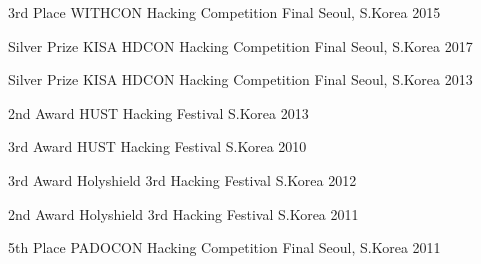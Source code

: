 \begin{cvhonors}

  \cvhonor
    {3rd Place} %
    {WITHCON Hacking Competition Final} %
    {Seoul, S.Korea} %
    {2015} %

  \cvhonor
    {Silver Prize} %
    {KISA HDCON Hacking Competition Final} %
    {Seoul, S.Korea} %
    {2017} %

  \cvhonor
    {Silver Prize} %
    {KISA HDCON Hacking Competition Final} %
    {Seoul, S.Korea} %
    {2013} %

  \cvhonor
    {2nd Award} %
    {HUST Hacking Festival} %
    {S.Korea} %
    {2013} %

  \cvhonor
    {3rd Award} %
    {HUST Hacking Festival} %
    {S.Korea} %
    {2010} %

  \cvhonor
    {3rd Award} %
    {Holyshield 3rd Hacking Festival} %
    {S.Korea} %
    {2012} %

  \cvhonor
    {2nd Award} %
    {Holyshield 3rd Hacking Festival} %
    {S.Korea} %
    {2011} %

  \cvhonor
    {5th Place} %
    {PADOCON Hacking Competition Final} %
    {Seoul, S.Korea} %
    {2011} %

\end{cvhonors}
